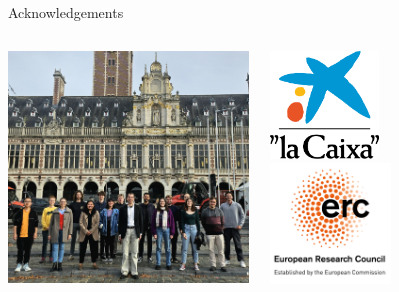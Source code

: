\documentclass[9pt,t,xcolor=table]{beamer}
\begin{document}
\appendix

\begin{frame}{\huge Acknowledgements}\large
	\centering
	\begin{columns}
		\begin{column}[c]{0.48\textwidth}
			\centering
			\vfill
			\includegraphics[width=\textwidth]{Figs/TJ.jpeg}
			\vfill
		\end{column}
		\begin{column}[c]{0.3\textwidth}
			\centering
			\includegraphics[width=0.45\textwidth]{Figs/La-Caixa.png}\\\vfill
			\includegraphics[width=0.5\textwidth]{Figs/erc.png}\\\vfill

\end{column}
\end{columns}
\end{frame}
\end{document}
